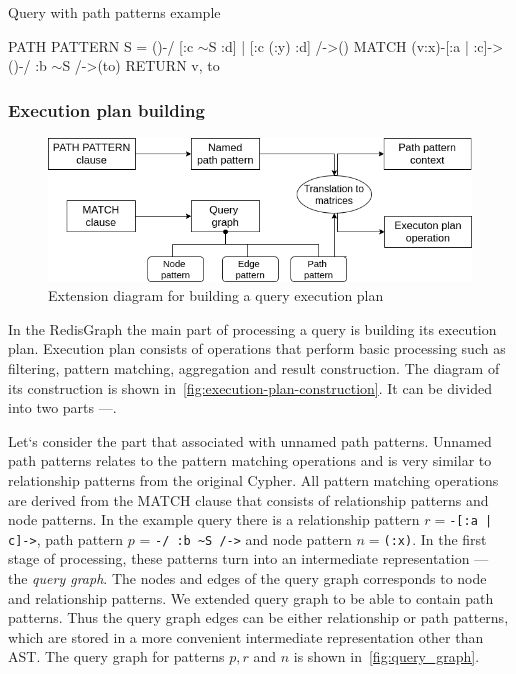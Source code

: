 \begin{algorithm}
\begin{algorithmic}[1]
\caption{Query with path patterns example}
\label{lst:cypher-example-3}
\State PATH PATTERN S = ()-/ [:c $\sim$S :d] | [:c (:y) :d] /->()
\State MATCH (v:x)-[:a | :c]->()-/ :b $\sim$S /->(to)
\State RETURN v, to
\end{algorithmic}
\end{algorithm}

\subsubsection{Execution plan building}
\begin{figure}[h]
  \centering
  \includegraphics[width=\linewidth]{execution-plan-building.png}
  \caption{Extension diagram for building a query execution plan}
  \label{fig:execution-plan-construction}
\end{figure}

In the RedisGraph the main part of processing a query is building its execution plan. Execution plan consists of operations that perform basic processing such as filtering, pattern matching, aggregation and result construction. The diagram of its construction is shown in~\autoref{fig:execution-plan-construction}. It can be divided into two parts ---.

Let`s consider the part that associated with unnamed path patterns. Unnamed path patterns relates to the pattern matching operations and is very similar to relationship patterns from the original Cypher. All pattern matching operations are derived from the MATCH clause that consists of relationship patterns and node patterns. In the example query there is a relationship pattern $r = $\lstinline{-[:a | c]->}, path pattern $p$ = \lstinline{-/ :b ~S /->} and node pattern $n = $\lstinline{(:x)}. In the first stage of processing, these patterns turn into an intermediate representation --- the \textit{query graph}. The nodes and edges of the query graph corresponds to node and relationship patterns. We extended query graph to be able to contain path patterns. Thus the query graph edges can be either relationship or path patterns, which are stored in a more convenient intermediate representation other than AST. The query graph for patterns $p, r$ and $n$ is shown in~\autoref{fig:query_graph}.

